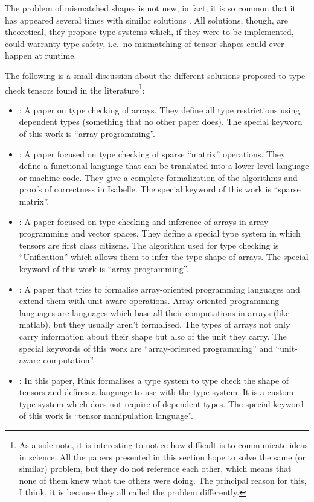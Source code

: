 The problem of mismatched shapes is not new, in fact, it is so common
that it has appeared several times with similar solutions
\autocites{arnold_specifying_2010}{griffioen_type_2015}{rink_modeling_2018}{slepak_array-oriented_2014}{trojahner_dependently_2009}.
All solutions, though, are theoretical, they propose type systems which,
if they were to be implemented, could warranty type safety, i.e.~no
mismatching of tensor shapes could ever happen at runtime.

The following is a small discussion about the different solutions
proposed to type check tensors found in the literature\footnote{As a
  side note, it is interesting to notice how difficult is to communicate
  ideas in science. All the papers presented in this section hope to
  solve the same (or similar) problem, but they do not reference each
  other, which means that none of them knew what the others were doing.
  The principal reason for this, I think, it is because they all called
  the problem differently.}:

\begin{itemize}
\item
  \textcite{trojahner_dependently_2009}: A paper on type checking of
  arrays. They define all type restrictions using dependent types
  (something that no other paper does). The special keyword of this work
  is \enquote{array programming}.
\item
  \textcite{arnold_specifying_2010}: A paper focused on type checking of
  sparse \enquote{matrix} operations. They define a functional language
  that can be translated into a lower level language or machine code.
  They give a complete formalization of the algorithms and proofs of
  correctness in Isabelle. The special keyword of this work is
  \enquote{sparse matrix}.
\item
  \textcite{griffioen_type_2015}: A paper focused on type checking and
  inference of arrays in array programming and vector spaces. They
  define a special type system in which tensors are first class
  citizens. The algorithm used for type checking is
  \enquote{Unification} which allows them to infer the type shape of
  arrays. The special keyword of this work is \enquote{array
  programming}.
\item
  \textcite{slepak_array-oriented_2014}: A paper that tries to formalise
  array-oriented programming languages and extend them with unit-aware
  operations. Array-oriented programming languages are languages which
  base all their computations in arrays (like matlab), but they usually
  aren't formalised. The types of arrays not only carry information
  about their shape but also of the unit they carry. The special
  keywords of this work are \enquote{array-oriented programming} and
  \enquote{unit-aware computation}.
\item
  \textcite{rink_modeling_2018}: In this paper, Rink formalises a type
  system to type check the shape of tensors and defines a language to
  use with the type system. It is a custom type system which does not
  require of dependent types. The special keyword of this work is
  \enquote{tensor manipulation language}.
\end{itemize}

